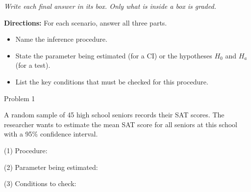 \documentclass[10pt]{article}
\begin{document}
{\small\itshape Write each final answer in its box. Only what is inside a box is graded.}\par

\vspace{0.1in}

\textbf{Directions:} For each scenario, answer all three parts.
\begin{itemize}[noitemsep]
  \item[(1)] Name the inference procedure.
  \item[(2)] State the parameter being estimated (for a CI) or the hypotheses $H_0$ and $H_a$ (for a test).
  \item[(3)] List the key conditions that must be checked for this procedure.
\end{itemize}

\boxguard[15]
\begin{notesbox}{Problem 1}
\par\noindent\begin{minipage}{\linewidth}
A random sample of 45 high school seniors records their SAT scores. The researcher wants
to estimate the mean SAT score for all seniors at this school with a 95\% confidence interval.

\vspace{0.08in}
(1) Procedure: \gradedblank[id=hw1a, type=short, points=1, answer={1-sample t-interval for mu}, check=text, display={\bfseries\boldmath 1-sample $t$-interval for $\mu$}]{3in}{0.3in}
\end{minipage}

\vspace{0.15in}
\par\noindent\begin{minipage}{\linewidth}
(2) Parameter being estimated:

\end{minipage}

\vspace{0.15in}
\par\noindent\begin{minipage}{\linewidth}
(3) Conditions to check:

\end{minipage}
\end{notesbox}
\end{document}
